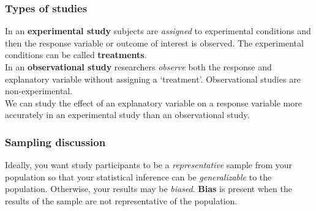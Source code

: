 \begin{frame}
\frametitle{Types of studies}
In an \textbf{experimental study} subjects are \emph{assigned} to experimental conditions and then the response variable or outcome of interest is observed.  The experimental conditions can be called \textbf{treatments}.
\\
\vskip10pt
In an \textbf{observational study} researchers \emph{observe} both the response and explanatory variable without assigning a `treatment'.  Observational studies are non-experimental.
\\
\vskip10pt
We can study the effect of an explanatory variable on a response variable more accurately in an experimental study than an observational study.
\end{frame}



\begin{frame}
\frametitle{Sampling discussion}
Ideally, you want study participants to be a \emph{representative} sample from your population so that your statistical inference can be \emph{generalizable} to the population.  Otherwise, your results may be \emph{biased}.
\vskip10pt
\textbf{Bias} is present when the results of the sample are not representative of the population.\\
\end{frame}

